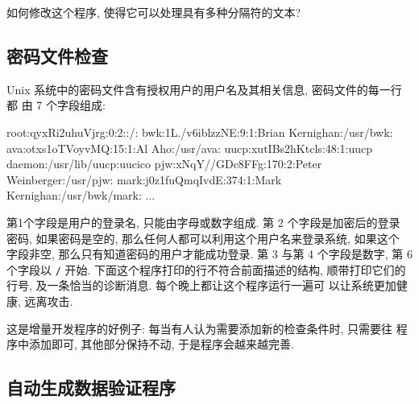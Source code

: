 \begin{exercise}
    如何修改这个程序, 使得它可以处理具有多种分隔符的文本?
\end{exercise}

\subsection{密码文件检查}
\label{subsec:password_file checking}

Unix 系统中的密码文件含有授权用户的用户名及其相关信息, 密码文件的每一行都
由 7 个字段组成:
\begin{awkcode}
    root:qyxRi2uhuVjrg:0:2::/:
    bwk:1L./v6iblzzNE:9:1:Brian Kernighan:/usr/bwk:
    ava:otxs1oTVoyvMQ:15:1:Al Aho:/usr/ava:
    uucp:xutIBs2hKtcls:48:1:uucp daemon:/usr/lib/uucp:uucico
    pjw:xNqY//GDc8FFg:170:2:Peter Weinberger:/usr/pjw:
    mark:j0z1fuQmqIvdE:374:1:Mark Kernighan:/usr/bwk/mark:
    ...
\end{awkcode}
第1个字段是用户的登录名, 只能由字母或数字组成. 第 2 个字段是加密后的登录
密码, 如果密码是空的, 那么任何人都可以利用这个用户名来登录系统, 如果这个
字段非空, 那么只有知道密码的用户才能成功登录. 第 3 与第 4 个字段是数字,
第 6 个字段以 \verb'/' 开始. 下面这个程序打印的行不符合前面描述的结构,
顺带打印它们的行号, 及一条恰当的诊断消息. 每个晚上都让这个程序运行一遍可
以让系统更加健康, 远离攻击.

这是增量开发程序的好例子: 每当有人认为需要添加新的检查条件时, 只需要往
程序中添加即可, 其他部分保持不动, 于是程序会越来越完善.

\subsection{自动生成数据验证程序}
\label{subsec:generating_data_validation_programs}

